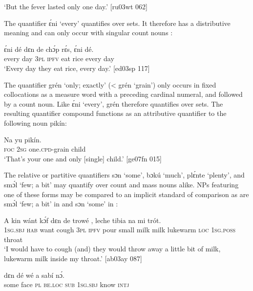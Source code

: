 \glt ‘But the fever lasted only one day.’ [ru03wt 062]
\z

The quantifier ɛ́ni ‘every’ quantifies over sets. It therefore has a distributive meaning and can only occur with singular count nouns :


\ea%
    \label{ex:key:271}
    \gll ɛ́ni    dé  dɛn  de  chɔ́p  rɛ́s,  ɛ́ni    dé.\\
every  day  \textsc{3pl}  \textsc{ipfv}  eat    rice  every  day\\

\glt ‘Every day they eat rice, every day.’ [ed03sp 117]
\z

The quantifier grén ‘only; exactly’ (< grén ‘grain’) only occurs in fixed collocations as a measure word with a preceding cardinal numeral, and followed by a count noun. Like ɛ́ni ‘every’, grén therefore quantifies over sets. The resulting quantifier compound{\fff} functions as an attributive quantifier to the following noun pikín:


\ea%
    \label{ex:key:272}
    \gll Na  yu   pikín.\\
\textsc{foc}  \textsc{2sg}  one.\textsc{cpd}{}-grain  child\\

\glt ‘That’s your one and only [single] child.’ [ge07fn 015]
\z

The relative or partitive{\fff} quantifiers sɔn ‘some’, bɔkú ‘much’, plɛ́nte ‘plenty’, and smɔ́l ‘few; a bit’ may quantify over count and mass nouns alike. NPs featuring one of these forms may be compared to an implicit standard of comparison as are smɔ́l ‘few; a bit’ in  and sɔn ‘some’ in : 


\ea%
    \label{ex:key:273}
    \gll \MakeUppercase{A}   kin  wánt  kɔ́f    dɛn  de  trowé   ,
leche  tibia      na  mi    trót.\\
\textsc{1sg.sbj}  \textsc{hab}  want  cough  \textsc{3pl}  \textsc{ipfv}  pour  small  milk
milk    lukewarm  \textsc{loc}  \textsc{1sg.poss}  throat\\
\glt ‘I would have to cough (and) they would throw away a little bit of milk,
lukewarm milk inside my throat.’ [ab03ay 087]
\z


\ea%
    \label{ex:key:274}
    \gll {}   dɛn  dé    wé  a    sabí    nɔ́.\\
some  face  \textsc{pl}  \textsc{be.loc}  \textsc{sub}  \textsc{1sg.sbj}  know  \textsc{intj}\\

